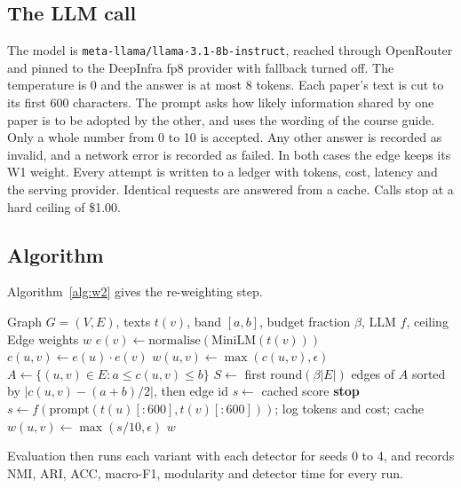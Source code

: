 \documentclass[journal]{IEEEtran}
\begin{document}
\subsection{The LLM call}
The model is \texttt{meta-llama/llama-3.1-8b-instruct}, reached through OpenRouter and pinned to the DeepInfra fp8 provider with fallback turned off. The temperature is 0 and the answer is at most 8 tokens. Each paper's text is cut to its first 600 characters. The prompt asks how likely information shared by one paper is to be adopted by the other, and uses the wording of the course guide. Only a whole number from 0 to 10 is accepted. Any other answer is recorded as invalid, and a network error is recorded as failed. In both cases the edge keeps its W1 weight. Every attempt is written to a ledger with tokens, cost, latency and the serving provider. Identical requests are answered from a cache. Calls stop at a hard ceiling of \$1.00.

\subsection{Algorithm}
Algorithm~\ref{alg:w2} gives the re-weighting step.

\begin{algorithm}[!t]
\caption{Budgeted LLM edge re-weighting (W2)}
\label{alg:w2}
\begin{algorithmic}[1]
\Require Graph $G=(V,E)$, texts $t(v)$, band $[a,b]$, budget fraction $\beta$, LLM $f$, ceiling
\Ensure Edge weights $w$
  \State $e(v)\gets \mathrm{normalise}(\mathrm{MiniLM}(t(v)))$ 
\EndFor
{}
  \State $c(u,v)\gets e(u)\cdot e(v)$
  \State $w(u,v)\gets \max(c(u,v),\epsilon)$ 
\EndFor
\State $A\gets\{(u,v)\in E: a\le c(u,v)\le b\}$
\State $S\gets$ first $\mathrm{round}(\beta|E|)$ edges of $A$ sorted by $|c(u,v)-(a+b)/2|$, then edge id
    \State $s\gets$ cached score
    \State \textbf{stop}
  \Else
    \State $s\gets f(\mathrm{prompt}(t(u)[{:}600],t(v)[{:}600]))$; log tokens and cost; cache
  \EndIf
    \State $w(u,v)\gets\max(s/10,\epsilon)$
  \EndIf
\EndFor
\State \Return $w$
\end{algorithmic}
\end{algorithm}

Evaluation then runs each variant with each detector for seeds 0 to 4, and records NMI, ARI, ACC, macro-F1, modularity and detector time for every run.
\end{document}
